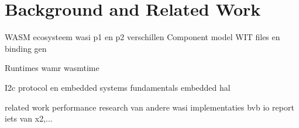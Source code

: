 \chapter{Background and Related Work}
\label{chap:2}

WASM ecosysteem
wasi p1 en p2 verschillen
Component model
WIT files en binding gen

Runtimes
wamr
wasmtime

I2c protocol en embedded systems
fundamentals
embedded hal

related work
performance research van andere wasi implementaties bvb io report iets van x2,...